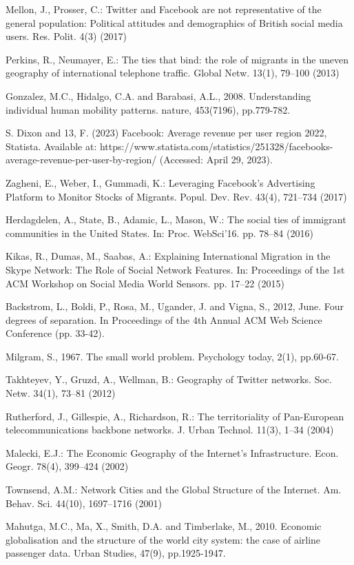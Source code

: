 \documentclass[12pt]{article}
\begin{document}
Mellon, J., Prosser, C.: Twitter and Facebook are not representative of the general
population: Political attitudes and demographics of British social media users. Res.
Polit. 4(3) (2017)

Perkins, R., Neumayer, E.: The ties that bind: the role of migrants in the uneven
geography of international telephone traffic. Global Netw. 13(1), 79–100 (2013)

Gonzalez, M.C., Hidalgo, C.A. and Barabasi, A.L., 2008. Understanding individual human mobility patterns. nature, 453(7196), pp.779-782.

S. Dixon and 13, F. (2023) Facebook: Average revenue per user region 2022, Statista. Available at: https://www.statista.com/statistics/251328/facebooks-average-revenue-per-user-by-region/ (Accessed: April 29, 2023). 

Zagheni, E., Weber, I., Gummadi, K.: Leveraging Facebook’s Advertising Platform
to Monitor Stocks of Migrants. Popul. Dev. Rev. 43(4), 721–734 (2017)

Herdagdelen, A., State, B., Adamic, L., Mason, W.: The social ties of immigrant
communities in the United States. In: Proc. WebSci’16. pp. 78–84 (2016)

Kikas, R., Dumas, M., Saabas, A.: Explaining International Migration in the Skype
Network: The Role of Social Network Features. In: Proceedings of the 1st ACM
Workshop on Social Media World Sensors. pp. 17–22 (2015)

Backstrom, L., Boldi, P., Rosa, M., Ugander, J. and Vigna, S., 2012, June. Four degrees of separation. In Proceedings of the 4th Annual ACM Web Science Conference (pp. 33-42).

Milgram, S., 1967. The small world problem. Psychology today, 2(1), pp.60-67.

Takhteyev, Y., Gruzd, A., Wellman, B.: Geography of Twitter networks. Soc. Netw.
34(1), 73–81 (2012)

Rutherford, J., Gillespie, A., Richardson, R.: The territoriality of Pan-European
telecommunications backbone networks. J. Urban Technol. 11(3), 1–34 (2004)

Malecki, E.J.: The Economic Geography of the Internet’s Infrastructure. Econ.
Geogr. 78(4), 399–424 (2002)

Townsend, A.M.: Network Cities and the Global Structure of the Internet. Am.
Behav. Sci. 44(10), 1697–1716 (2001)

Mahutga, M.C., Ma, X., Smith, D.A. and Timberlake, M., 2010. Economic globalisation and the structure of the world city system: the case of airline passenger data. Urban Studies, 47(9), pp.1925-1947.
\end{document}
